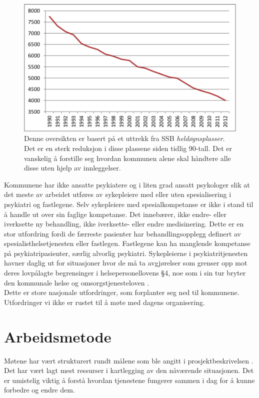 \documentclass[11pt]{report} %
\begin{document}
                \begin{figure}[ht]
                  \centering
                  \includegraphics{./pix/heldgnpsykplass}
                  \caption[Oversikt over reduksjon i \textit{heldøgnsplasser}.]
                   {Denne oversikten er basert på et uttrekk fra SSB \textit{heldøgnsplasser}. Det er en sterk reduksjon i disse plassene siden tidlig 90-tall. Det er vanskelig å forstille seg hvordan kommunen alene skal håndtere alle disse uten hjelp av innleggelser.}
                \end{figure}  


                    Kommunene har ikke ansatte psykiatere og i liten grad ansatt psykologer slik at det meste av arbeidet utføres av sykepleiere med eller uten spesialisering i psykiatri og fastlegene. Selv sykepleiere med spesialkompetanse er ikke i stand til å handle ut over sin faglige kompetanse. Det innebærer, ikke endre- eller iverksette ny behandling, ikke iverksette- eller endre medisinering. Dette er en stor utfordring fordi de færreste pasienter har behandlingsopplegg definert av spesialisthelsetjenesten eller fastlegen. Fastlegene kan ha manglende kompetanse på psykiatripasienter, særlig alvorlig psykiatri. 
                    Sykepleierne i psykiatritjenesten havner daglig ut for situasjoner hvor de må ta avgjørelser som grenser opp mot deres lovpålagte begrensinger i helsepersonellovens §4, noe som i sin tur bryter den kommunale helse og omsorgstjenesteloven
                    \cite{HOTJL-12}.\\
                    Dette er store nasjonale utfordringer, som forplanter seg ned til kommunene. Utfordringer vi ikke er rustet til å møte med dagens organisering. \\

                \chapter{Arbeidsmetode}\label{chap:meto}
                  Møtene har vært strukturert rundt målene som ble angitt i prosjektbeskrivelsen
                  \cite{ProPlan-1}. Det har vært lagt mest ressurser i kartlegging av den nåværende situasjonen. Det er umistelig viktig å forstå hvordan tjenestene fungerer sammen i dag for å kunne forbedre og endre dem.\\
\end{document}
